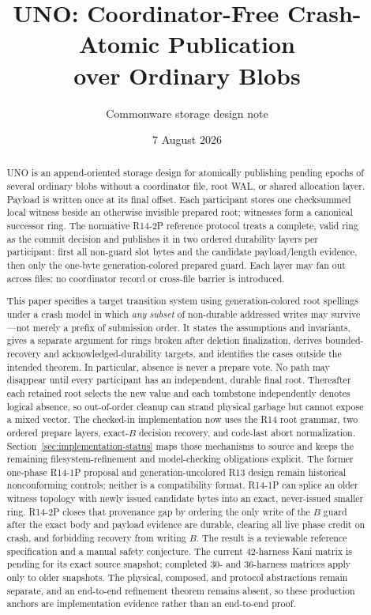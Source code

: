 \documentclass[10pt,twocolumn]{article}
\title{\vspace{-1.2em}\textbf{UNO: Coordinator-Free Crash-Atomic Publication\\over Ordinary Blobs}}
\author{Commonware storage design note}
\date{7 August 2026}
\theoremstyle{remark}
\begin{document}
\maketitle

\begin{abstract}
UNO is an append-oriented storage design for atomically publishing pending epochs of several
ordinary blobs without a coordinator file, root WAL, or shared allocation layer. Payload is written
once at its final offset. Each participant stores one checksummed local witness beside an otherwise
invisible prepared root; witnesses form a canonical successor ring. The normative R14-2P reference
protocol treats a complete, valid ring as the commit decision and publishes it in two ordered
durability layers per participant: first all non-guard slot bytes and the candidate payload/length
evidence, then only the one-byte generation-colored prepared guard. Each layer may fan out across
files; no coordinator record or cross-file barrier is introduced.

This paper specifies a target transition system using generation-colored root spellings under a crash model
in which \emph{any subset} of non-durable addressed writes may survive---not merely a prefix of
submission order. It states the assumptions and invariants, gives a separate argument for rings
broken after deletion finalization, derives bounded-recovery and acknowledged-durability targets,
and identifies the cases outside the intended theorem. In particular,
absence is never a prepare vote. No path may disappear until every participant has an independent,
durable final root. Thereafter each retained root selects the new value and each tombstone
independently denotes logical absence, so out-of-order cleanup can strand physical garbage but
cannot expose a mixed vector. The checked-in implementation now uses the R14 root grammar,
two ordered prepare layers, exact-$B$ decision recovery, and code-last abort normalization.
Section~\ref{sec:implementation-status} maps those mechanisms to source and keeps the remaining
filesystem-refinement and model-checking obligations explicit. The former one-phase R14-1P proposal
and generation-uncolored R13 design remain historical nonconforming controls; neither is a
compatibility format. R14-1P can splice an older witness topology with newly issued candidate
bytes into an exact, never-issued smaller ring. R14-2P closes that provenance gap by ordering the
only write of the $B$ guard after the exact body and payload evidence are durable, clearing all live
phase credit on crash, and forbidding recovery from writing $B$. The result is a reviewable
reference specification and a manual safety conjecture. The current 42-harness Kani matrix is
pending for its exact source snapshot; completed 30- and 36-harness matrices apply only to older
snapshots. The physical, composed, and protocol abstractions remain separate, and an end-to-end
refinement theorem remains absent, so these production anchors are implementation evidence rather
than an end-to-end proof.
\end{abstract}
\end{document}

